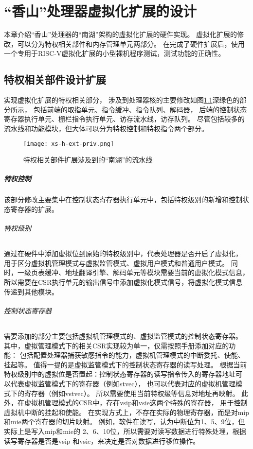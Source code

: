 \chapter{“香山”处理器虚拟化扩展的设计}


本章介绍“香山”处理器的“南湖”架构的虚拟化扩展的硬件实现。
虚拟化扩展的修改，可以分为特权相关部件和内存管理单元两部分。
在完成了硬件扩展后，使用一个专用于RISC-V虚拟化扩展的小型裸机程序测试，测试功能的正确性。

\section{特权相关部件设计扩展}
实现虚拟化扩展的特权相关部分，
涉及到处理器核的主要修改如图\ref{fig:xs-h-ext-priv}深绿色的部分所示，
包括前端的取指单元、指令缓冲、指令队列、解码器，
后端的控制状态寄存器执行单元、栅栏指令执行单元、访存流水线，访存队列。
尽管包括较多的流水线和功能模块，但大体可以分为特权控制和特权指令两个部分。

\begin{figure}[htbp]
    \centering
    \texttt{[image: xs-h-ext-priv.png]}
    \caption{特权相关部件扩展涉及到的“南湖”的流水线}
    \label{fig:xs-h-ext-priv}
\end{figure}

\paragraph{特权控制}
该部分修改主要集中在控制状态寄存器执行单元中，包括特权级别的新增和控制状态寄存器的扩展。

\subparagraph{特权级别}
通过在硬件中添加虚拟位到原始的特权级别中，代表处理器是否开启了虚拟化，
用于区分虚拟机管理模式与虚拟监管模式、虚拟用户模式和普通用户模式。
同时，一级页表缓冲、地址翻译引擎、解码单元等模块需要当前的虚拟化模式信息，
所以需要在CSR执行单元的输出信号中添加虚拟化模式信号，将虚拟化模式信息传递到其他模块。

\subparagraph{控制状态寄存器}
需要添加的部分主要包括虚拟机管理模式的、虚拟监管模式的控制状态寄存器。
其中，虚拟管理模式下的相关CSR实现较为单一，仅需按照手册添加对应的功能：
包括配置处理器捕获敏感指令的能力，虚拟机管理模式的中断委托、使能、挂起等。
值得一提的是虚拟监管模式下的控制状态寄存器的读写处理。
根据当前特权级别中的虚拟位是否置起：控制状态寄存器的读写指令传入的寄存器地址可
以代表虚拟监管模式下的寄存器（例如stvec），
也可以代表对应的虚拟机管理模式下的寄存器（例如vstvec）。
所以需要使用当前特权级等信息对地址再映射。
此外，在虚拟机管理模式的CSR中，存在vsip和vsie这两个特殊的寄存器，
用于控制虚拟机中断的挂起和使能。
在实现方式上，不存在实际的物理寄存器，而是对mip和mie两个寄存器的切片映射。
例如，软件在读写，认为中断位为1、5、9位，但实际上是写入mip和mie的
2、6、10位，所以需要对读写数据进行特殊处理，根据读写寄存器是否是vsip
和vsie，来决定是否对数据进行移位操作。


